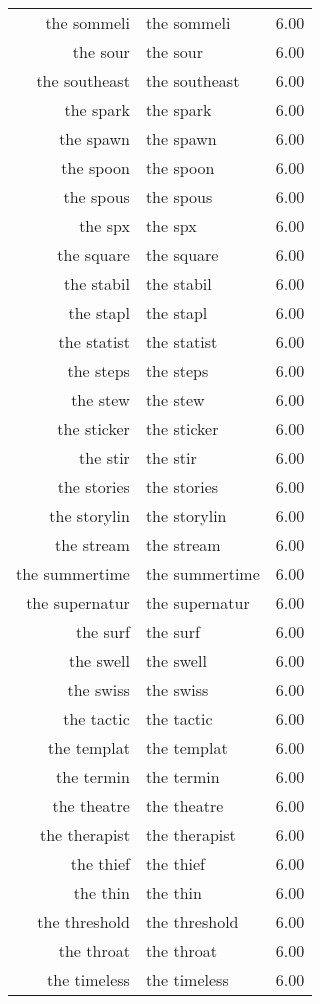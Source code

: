 \begin{table}[ht]
\begin{tabular}{rlr}
  the sommeli & the sommeli & 6.00 \\ 
  the sour & the sour & 6.00 \\ 
  the southeast & the southeast & 6.00 \\ 
  the spark & the spark & 6.00 \\ 
  the spawn & the spawn & 6.00 \\ 
  the spoon & the spoon & 6.00 \\ 
  the spous & the spous & 6.00 \\ 
  the spx & the spx & 6.00 \\ 
  the square & the square & 6.00 \\ 
  the stabil & the stabil & 6.00 \\ 
  the stapl & the stapl & 6.00 \\ 
  the statist & the statist & 6.00 \\ 
  the steps & the steps & 6.00 \\ 
  the stew & the stew & 6.00 \\ 
  the sticker & the sticker & 6.00 \\ 
  the stir & the stir & 6.00 \\ 
  the stories & the stories & 6.00 \\ 
  the storylin & the storylin & 6.00 \\ 
  the stream & the stream & 6.00 \\ 
  the summertime & the summertime & 6.00 \\ 
  the supernatur & the supernatur & 6.00 \\ 
  the surf & the surf & 6.00 \\ 
  the swell & the swell & 6.00 \\ 
  the swiss & the swiss & 6.00 \\ 
  the tactic & the tactic & 6.00 \\ 
  the templat & the templat & 6.00 \\ 
  the termin & the termin & 6.00 \\ 
  the theatre & the theatre & 6.00 \\ 
  the therapist & the therapist & 6.00 \\ 
  the thief & the thief & 6.00 \\ 
  the thin & the thin & 6.00 \\ 
  the threshold & the threshold & 6.00 \\ 
  the throat & the throat & 6.00 \\ 
  the timeless & the timeless & 6.00 \\ 

\end{tabular}
\end{table}
